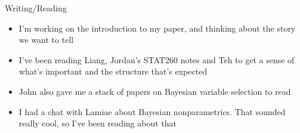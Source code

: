 \documentclass{beamer}
\begin{document}
\begin{frame}{Writing/Reading}
\begin{itemize}
\item I'm working on the introduction to my paper, and thinking about the story we want to tell
\item I've been reading Liang, Jordan's STAT260 notes and Teh to get a sense of what's important and the
structure that's expected
\item John also gave me a stack of papers on Bayesian variable selection to read
\item I had a chat with Lamiae about Bayesian nonparametrics. That sounded really cool, so I've been reading
about that
\end{itemize}
\end{frame}
\end{document}
